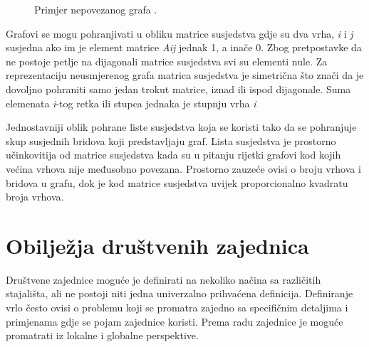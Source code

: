 \begin{figure}
	\caption{Primjer nepovezanog grafa \cite{nakic_pavcevic_2019}.}
	\label{fig:graph}
\end{figure}

Grafovi se mogu pohranjivati u obliku matrice susjedstva gdje su dva vrha, \textit{i} i \textit{j} susjedna ako im je element matrice \textit{A{ij}} jednak 1, a inače 0. Zbog pretpostavke da ne postoje petlje na dijagonali matrice susjedstva svi su elementi nule. Za reprezentaciju neusmjerenog grafa matrica susjedstva je simetrična što znači da je dovoljno pohraniti samo jedan trokut matrice, iznad ili ispod dijagonale. Suma elemenata \textit{i}-tog retka ili stupca jednaka je stupnju vrha \textit{i}

Jednostavniji oblik pohrane liste susjedstva koja se koristi tako da se pohranjuje skup susjednih bridova koji predstavljaju graf. Lista susjedstva je prostorno učinkovitija od matrice susjedstva kada su u pitanju rijetki grafovi kod kojih većina vrhova nije međusobno povezana. Prostorno zauzeće ovisi o broju vrhova i bridova u grafu, dok je kod matrice susjedstva uvijek proporcionalno kvadratu broja vrhova.


\section{Obilježja društvenih zajednica} 

Društvene zajednice moguće je definirati na nekoliko načina sa različitih stajališta, ali ne postoji niti jedna univerzalno prihvaćena definicija. Definiranje vrlo često ovisi o problemu koji se promatra zajedno sa specifičnim detaljima i primjenama gdje se pojam zajednice koristi. Prema radu \cite{fortunato2010community} zajednice je moguće promatrati iz lokalne i globalne perspektive.

